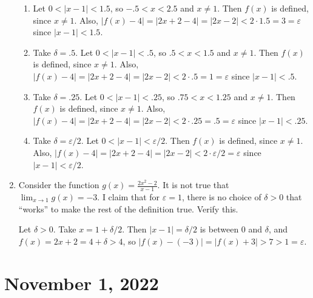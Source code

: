 \documentclass[12pt]{amsart}
\def\ds{\displaystyle}
\def\d{\delta}
\def\e{\varepsilon}
\numberwithin{equation}{section}
\theoremstyle{plain} %
\newcommand{\Nov}[1]{\section{November #1, 2022}}
\theoremstyle{definition}
\theoremstyle{remark}
\begin{document}
\begin{enumerate}
\begin{framed}
\begin{enumerate}
\item Let $0<|x-1|<1.5$, so $-.5<x<2.5$ and $x\neq 1$. Then $f(x)$ is defined, since $x\neq 1$. Also, $|f(x)-4| = |2x+2 - 4| = |2x-2| < 2 \cdot 1.5 = 3 = \e$ since $|x-1|<1.5$.
\item Take $\d=.5$. Let $0<|x-1|<.5$, so $.5<x<1.5$ and $x\neq 1$. Then $f(x)$ is defined, since $x\neq 1$. Also, $|f(x)-4| = |2x+2 - 4| = |2x-2| < 2 \cdot .5 = 1 = \e$ since $|x-1|<.5$.
\item Take $\d=.25$. Let $0<|x-1|<.25$, so $.75<x<1.25$ and $x\neq 1$. Then $f(x)$ is defined, since $x\neq 1$. Also, $|f(x)-4| = |2x+2 - 4| = |2x-2| < 2 \cdot .25 = .5 = \e$ since $|x-1|<.25$.
\item Take $\d=\e/2$. Let $0<|x-1|<\e/2$. Then $f(x)$ is defined, since $x\neq 1$. Also, $|f(x)-4| = |2x+2 - 4| = |2x-2| < 2 \cdot \e/2 = \e$ since $|x-1|<\e/2$.
\end{enumerate}
\end{framed}

\item Consider the function $\ds g(x)=\frac{2x^2-2}{x-1}$. It is not true that $\lim_{x\to 1}  g(x) = -3$. I claim that for $\e=1$, there is no choice of $\delta>0$ that ``works'' to make the rest of the definition true. Verify this.

\begin{framed}
Let $\d>0$. Take $x=1+\d/2$. Then $|x-1|=\d/2$ is between $0$ and $\delta$, and $f(x) = 2x+2 = 4+\d > 4$, so $|f(x) - (-3)| = |f(x)+3| > 7> 1 = \e$.
\end{framed}
\end{enumerate}



\Nov{1}
\end{document}
